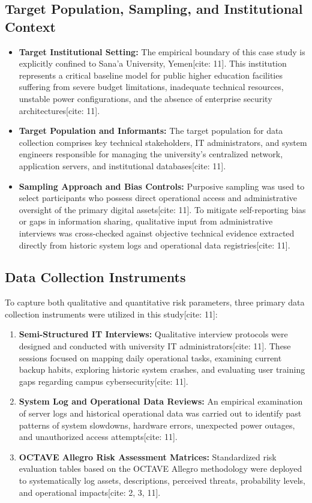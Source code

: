 \documentclass[journal,onecolumn,12pt,twoside]{IEEEtran}
\begin{document}
	\subsection{Target Population, Sampling, and Institutional Context}
	\label{subsec:population_sampling}
	\begin{itemize}
		\item \textbf{Target Institutional Setting:} The empirical boundary of this case study is explicitly confined to Sana'a University, Yemen[cite: 11]. This institution represents a critical baseline model for public higher education facilities suffering from severe budget limitations, inadequate technical resources, unstable power configurations, and the absence of enterprise security architectures[cite: 11].
		\item \textbf{Target Population and Informants:} The target population for data collection comprises key technical stakeholders, IT administrators, and system engineers responsible for managing the university's centralized network, application servers, and institutional databases[cite: 11]. 
		\item \textbf{Sampling Approach and Bias Controls:} Purposive sampling was used to select participants who possess direct operational access and administrative oversight of the primary digital assets[cite: 11]. To mitigate self-reporting bias or gaps in information sharing, qualitative input from administrative interviews was cross-checked against objective technical evidence extracted directly from historic system logs and operational data registries[cite: 11].
	\end{itemize}
	
	\subsection{Data Collection Instruments}
	\label{subsec:data_instruments}
	To capture both qualitative and quantitative risk parameters, three primary data collection instruments were utilized in this study[cite: 11]:
	\begin{enumerate}
		\item \textbf{Semi-Structured IT Interviews:} Qualitative interview protocols were designed and conducted with university IT administrators[cite: 11]. These sessions focused on mapping daily operational tasks, examining current backup habits, exploring historic system crashes, and evaluating user training gaps regarding campus cybersecurity[cite: 11].
		\item \textbf{System Log and Operational Data Reviews:} An empirical examination of server logs and historical operational data was carried out to identify past patterns of system slowdowns, hardware errors, unexpected power outages, and unauthorized access attempts[cite: 11].
		\item \textbf{OCTAVE Allegro Risk Assessment Matrices:} Standardized risk evaluation tables based on the OCTAVE Allegro methodology were deployed to systematically log assets, descriptions, perceived threats, probability levels, and operational impacts[cite: 2, 3, 11].
	\end{enumerate}
	
\end{document}
